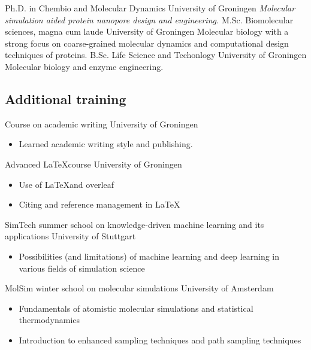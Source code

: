 \documentclass[letterpaper]{twentysecondcv} %
\begin{document}
\begin{twenty} %
		{Ph.D. {\normalfont in Chembio and Molecular Dynamics}}
		{University of Groningen}
		{\emph{Molecular simulation aided protein nanopore design and engineering.}}
		{M.Sc. Biomolecular sciences, magna cum laude}
		{University of Groningen}
		{Molecular biology with a strong focus on coarse-grained molecular dynamics and computational design techniques of proteins.}
		{B.Sc. Life Science and Techonlogy}
		{University of Groningen}
		{Molecular biology and enzyme engineering.}
\end{twenty}




\subsection{Additional training}

\begin{twenty}
		{Course on academic writing}
		{University of Groningen}
		{\begin{itemize}
			\item Learned academic writing style and publishing.
		\end{itemize}}
		{Advanced \LaTeX course}
		{University of Groningen}
		{\begin{itemize}
			\item Use of \LaTeX and overleaf
			\item Citing and reference management in \LaTeX
		\end{itemize}}
		{SimTech summer school on knowledge-driven machine learning and its applications}
		{University of Stuttgart}
		{\begin{itemize}
			\item Possibilities (and limitations) of machine learning and deep learning in various fields of simulation science
		\end{itemize}}
		{MolSim winter school on molecular simulations}
		{University of Amsterdam}
		{\begin{itemize}
			\item Fundamentals of atomistic molecular simulations and statistical thermodynamics
			\item Introduction to enhanced sampling techniques and path sampling techniques
		\end{itemize}}
\end{twenty}
\end{document}
